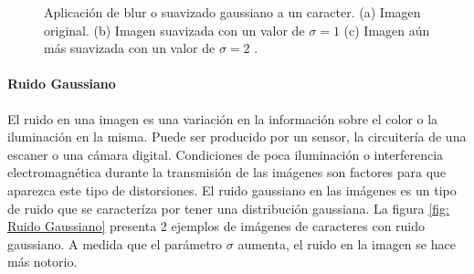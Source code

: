		\begin{figure}[htbp]
			\centering
			\caption[Suavizado Gaussiano de un caracter]{Aplicación de blur o suavizado gaussiano a un caracter. (a) Imagen original. (b) Imagen suavizada con un valor de $\sigma = 1$  (c) Imagen aún más suavizada con un valor de $\sigma = 2$ .}
			\label{fig: Suavizado Gaussiano}
		\end{figure}				
			
			
		\paragraph{Ruido Gaussiano}			
			
			El ruido en una imagen es una variación en la información sobre el color o la iluminación en la misma. Puede ser producido por un sensor, la circuitería de una escaner o una cámara digital. Condiciones de poca iluminación o interferencia electromagnética durante la transmisión de las imágenes son factores para que aparezca este tipo de distorsiones. El ruido gaussiano en las imágenes es un tipo de ruido que se caracteríza por tener una distribución gaussiana. La figura \ref{fig: Ruido Gaussiano} presenta 2 ejemplos de imágenes de caracteres con ruido gaussiano. A medida que el parámetro $\sigma$  aumenta, el ruido en la imagen se hace más notorio.
			
